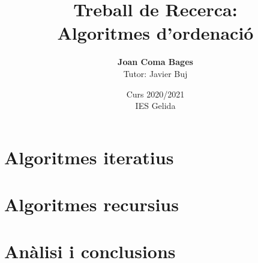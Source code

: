 \documentclass[a4paper,12pt]{report}
\title{Treball de Recerca: \\ \textbf{Algoritmes d'ordenació}}
\author{\textbf{Joan Coma Bages} \\ Tutor: Javier Buj}
\date{Curs 2020/2021 \\ IES Gelida}
\begin{document}
	\maketitle
	\tableofcontents
	
	
	
	
	
	\part{Algoritmes iteratius}
	
	
	
	

	\part{Algoritmes recursius}
	
	
	
	
	\part{Anàlisi i conclusions}
	
	

	

	
	
\end{document}
